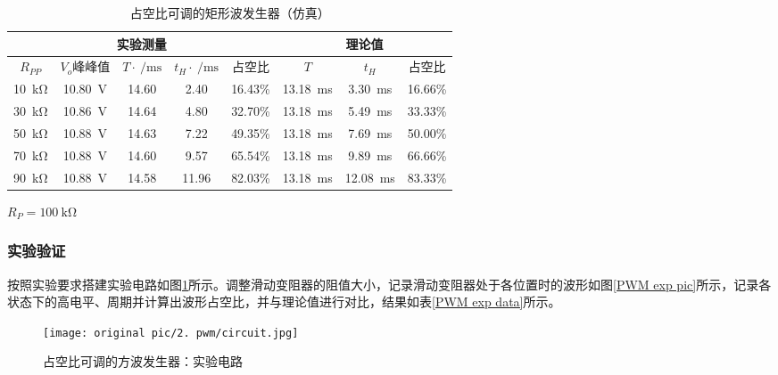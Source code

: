 \documentclass[UTF8]{ctexart}
\numberwithin{figure}{subsection}
\numberwithin{table}{subsection}
\numberwithin{equation}{subsection}
\begin{document}
\begin{table}[h]
    \begin{center}
        \caption{占空比可调的矩形波发生器（仿真）}
        \begin{tabular}{|c|c|c|c|c|c|c|c|}
            \hline
            \multicolumn{5}{|c|}{实验测量} & \multicolumn{3}{c|}{理论值} \\
            \hline
            \(R_{PP}\) & \(V_o\)峰峰值 & \(T\cdot\SI{}{\per\milli\second}\) & \(t_H\cdot\SI{}{\per\milli\second}\) & 占空比 & \(T\) & \(t_H\) & 占空比 \\
            \hline
            \SI{10}{\kilo\ohm} & \SI{10.80}{\volt} & 14.60 & 2.40 & 16.43\% & \SI{13.18}{\milli\second} & \SI{3.30}{\milli\second} & 16.66\%\\
            \hline
            \SI{30}{\kilo\ohm} & \SI{10.86}{\volt} & 14.64 & 4.80 & 32.70\% & \SI{13.18}{\milli\second} & \SI{5.49}{\milli\second} & 33.33\%\\
            \hline
            \SI{50}{\kilo\ohm} & \SI{10.88}{\volt} & 14.63 & 7.22 & 49.35\% & \SI{13.18}{\milli\second} & \SI{7.69}{\milli\second} & 50.00\%\\
            \hline
            \SI{70}{\kilo\ohm} & \SI{10.88}{\volt} & 14.60 & 9.57 & 65.54\% & \SI{13.18}{\milli\second} & \SI{9.89}{\milli\second} & 66.66\%\\
            \hline
            \SI{90}{\kilo\ohm} & \SI{10.88}{\volt} & 14.58 & 11.96 & 82.03\% & \SI{13.18}{\milli\second} & \SI{12.08}{\milli\second} & 83.33\%\\
            \hline
        \end{tabular}
        \par \(R_P = \SI{100}{\kilo\ohm}\)
    \end{center}
    \label{PWM sim data}
\end{table}

\subsubsection{实验验证}
\par 按照实验要求搭建实验电路如图\ref{pwm exp circuit}所示。调整滑动变阻器的阻值大小，记录滑动变阻器处于各位置时的波形如图\ref{PWM exp pic}所示，记录各状态下的高电平、周期并计算出波形占空比，并与理论值进行对比，结果如表\ref{PWM exp data}所示。


\begin{figure}[H]
    \begin{center}
        \caption{占空比可调的方波发生器：实验电路}
        \texttt{[image: original pic/2. pwm/circuit.jpg]}
        \label{pwm exp circuit}
    \end{center}
\end{figure}
\end{document}
